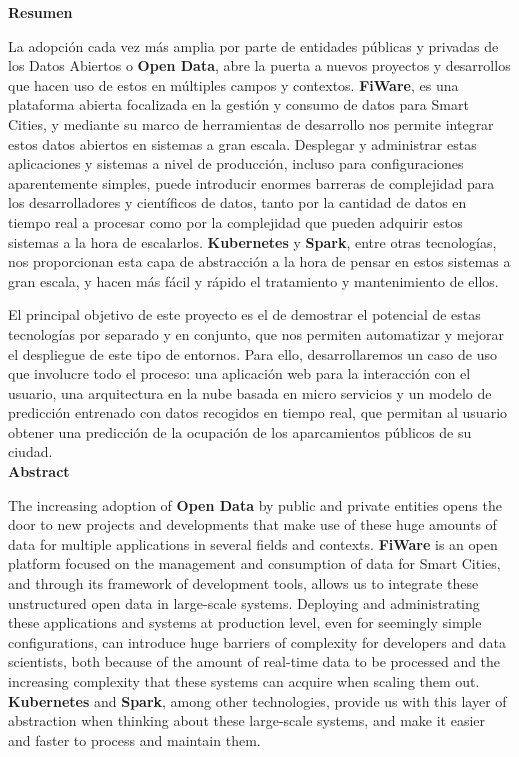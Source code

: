 {\Large \bfseries Resumen}

La adopción cada vez más amplia por parte de entidades públicas y privadas de los Datos Abiertos o \textbf{Open Data}, abre la puerta a nuevos proyectos y desarrollos que hacen uso de estos en múltiples campos y contextos. \textbf{FiWare}, es una plataforma abierta focalizada en la gestión y consumo de datos para Smart Cities, y mediante su marco de herramientas de desarrollo nos permite integrar estos datos abiertos en sistemas a gran escala. Desplegar y administrar estas aplicaciones y sistemas a nivel de producción, incluso para configuraciones aparentemente simples, puede introducir enormes barreras de complejidad para los desarrolladores y científicos de datos, tanto por la cantidad de datos en tiempo real a procesar como por la complejidad que pueden adquirir estos sistemas a la hora de escalarlos. \textbf{Kubernetes} y \textbf{Spark}, entre otras tecnologías, nos proporcionan esta capa de abstracción a la hora de pensar en estos sistemas a gran escala, y hacen más fácil y rápido el tratamiento y mantenimiento de ellos.

El principal objetivo de este proyecto es el de demostrar el potencial de estas tecnologías por separado y en conjunto, que nos permiten automatizar y mejorar el despliegue de este tipo de entornos. Para ello, desarrollaremos un caso de uso que involucre todo el proceso: una aplicación web para la interacción con el usuario, una arquitectura en la nube basada en micro servicios y un modelo de predicción entrenado con datos recogidos en tiempo real, que permitan al usuario obtener una predicción de la ocupación de los aparcamientos públicos de su ciudad.\\

{\Large \bfseries Abstract}

The increasing adoption of \textbf{Open Data} by public and private entities opens the door to new projects and developments that make use of these huge amounts of data for multiple applications in several fields and contexts. \textbf{FiWare} is an open platform focused on the management and consumption of data for Smart Cities, and through its framework of development tools, allows us to integrate these unstructured open data in large-scale systems. Deploying and administrating these applications and systems at production level, even for seemingly simple configurations, can introduce huge barriers of complexity for developers and data scientists, both because of the amount of real-time data to be processed and the increasing complexity that these systems can acquire when scaling them out. \textbf{Kubernetes} and \textbf{Spark}, among other technologies, provide us with this layer of abstraction when thinking about these large-scale systems, and make it easier and faster to process and maintain them.

